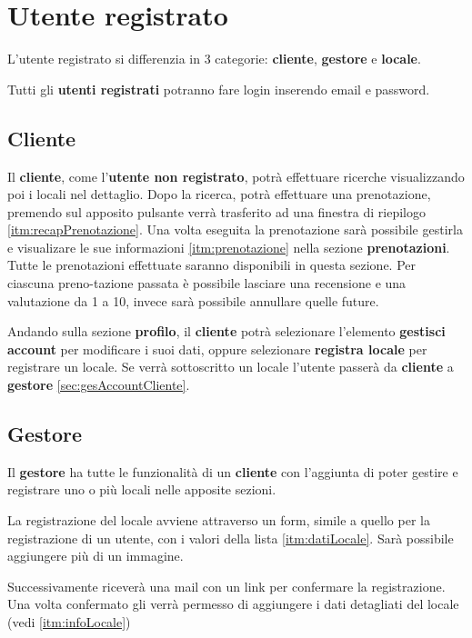 \section{Utente registrato}\label{sec:utenteRegistrato}
L'utente registrato si differenzia in 3 categorie:  \textbf{cliente}, \textbf{gestore} e \textbf{locale}.

Tutti gli \textbf{utenti registrati} potranno fare login inserendo email e password.

\subsection{Cliente}

Il \textbf{cliente}, come l'\textbf{utente non registrato}, potrà effettuare ricerche visualizzando poi
i locali nel dettaglio.
Dopo la ricerca, potrà effettuare una prenotazione, premendo sul apposito pulsante verrà trasferito ad una finestra
di riepilogo \ref{itm:recapPrenotazione}. 
Una volta eseguita la prenotazione sarà possibile gestirla e visualizare le sue informazioni \ref{itm:prenotazione} 
nella sezione \textbf{prenotazioni}. Tutte le prenotazioni effettuate saranno disponibili in questa sezione. Per 
ciascuna preno-tazione passata è possibile lasciare una recensione e una valutazione da 1 a 10, invece sarà possibile
annullare quelle future. 

Andando sulla sezione \textbf{profilo}, il \textbf{cliente} potrà selezionare l'elemento \textbf{gestisci 
account} per modificare i suoi dati, oppure selezionare \textbf{registra locale} per registrare un locale. Se verrà
sottoscritto un locale l'utente passerà da \textbf{cliente} a \textbf{gestore}
\ref{sec:gesAccountCliente}. 

\subsection{Gestore}
Il \textbf{gestore} ha tutte le funzionalità di un \textbf{cliente} con l'aggiunta di poter gestire e registrare 
uno o più locali nelle apposite sezioni.

La registrazione del locale avviene attraverso un form, simile a quello per la registrazione di un utente, con i 
valori della lista \ref{itm:datiLocale}. Sarà possibile aggiungere più di un immagine.

Successivamente riceverà una mail con un link per confermare la registrazione. Una volta confermato gli verrà 
permesso di aggiungere i dati detagliati del locale (vedi \ref{itm:infoLocale})

